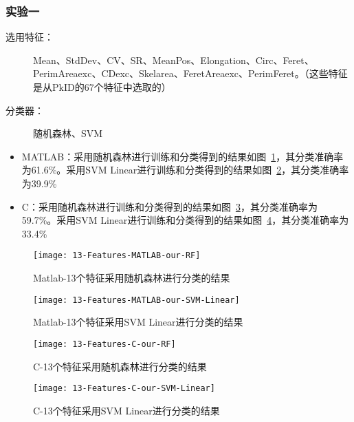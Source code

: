\subsubsection{实验一}
\label{shiyan1-features}
\begin{description}
\item[选用特征：] Mean、StdDev、CV、SR、MeanPos、Elongation、Circ、Feret、PerimAreaexc、CDexc、Skelarea、FeretAreaexc、PerimFeret。（这些特征是从PkID的67个特征中选取的）
\item[分类器：] 随机森林、SVM
\end{description}
\begin{itemize}
\item MATLAB：采用随机森林进行训练和分类得到的结果如图~\ref{fig:13-Features-MATLAB-our-RF}，其分类准确率为61.6\%。采用SVM Linear进行训练和分类得到的结果如图~\ref{fig:13-Features-MATLAB-our-SVM-Linear}，其分类准确率为39.9\%
\item C：采用随机森林进行训练和分类得到的结果如图~\ref{fig:13-Features-C-our-RF}，其分类准确率为59.7\%。采用SVM Linear进行训练和分类得到的结果如图~\ref{fig:13-Features-C-our-SVM-Linear}，其分类准确率为33.4\%
\end{itemize}

\begin{figure}[!ht]
\centering
\texttt{[image: 13-Features-MATLAB-our-RF]}
\caption{Matlab-13个特征采用随机森林进行分类的结果}
\label{fig:13-Features-MATLAB-our-RF}
\end{figure}

\begin{figure}[!ht]
\centering
\texttt{[image: 13-Features-MATLAB-our-SVM-Linear]}
\caption{Matlab-13个特征采用SVM Linear进行分类的结果}
\label{fig:13-Features-MATLAB-our-SVM-Linear}
\end{figure}

\begin{figure}[!ht]
\centering
\texttt{[image: 13-Features-C-our-RF]}
\caption{C-13个特征采用随机森林进行分类的结果}
\label{fig:13-Features-C-our-RF}
\end{figure}

\begin{figure}[!ht]
\centering
\texttt{[image: 13-Features-C-our-SVM-Linear]}
\caption{C-13个特征采用SVM Linear进行分类的结果}
\label{fig:13-Features-C-our-SVM-Linear}
\end{figure}

